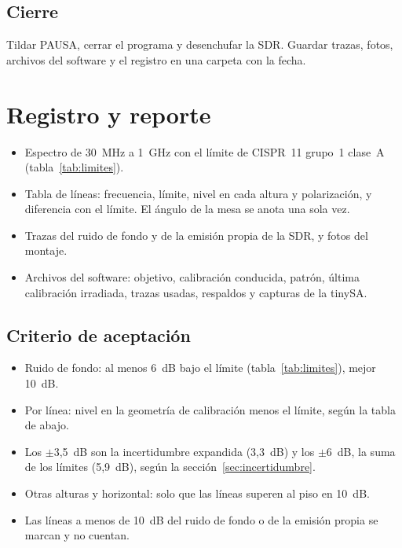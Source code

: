 \documentclass[11pt,a4paper]{article}
\begin{document}
\subsection{Cierre}

Tildar PAUSA, cerrar el programa y desenchufar la SDR. Guardar trazas, fotos, archivos del software y el registro en una carpeta con la fecha.

\section{Registro y reporte}\label{sec:registro}

\begin{itemize}
  \item Espectro de 30~MHz a 1~GHz con el límite de CISPR~11 grupo~1 clase~A (tabla~\ref{tab:limites}).
  \item Tabla de líneas: frecuencia, límite, nivel en cada altura y polarización, y diferencia con el límite. El ángulo de la mesa se anota una sola vez.
  \item Trazas del ruido de fondo y de la emisión propia de la SDR, y fotos del montaje.
  \item Archivos del software: objetivo, calibración conducida, patrón, última calibración irradiada, trazas usadas, respaldos y capturas de la tinySA.
\end{itemize}

\subsection{Criterio de aceptación}\label{sec:criterio}

\begin{itemize}
  \item Ruido de fondo: al menos 6~dB bajo el límite (tabla~\ref{tab:limites}), mejor 10~dB.
  \item Por línea: nivel en la geometría de calibración menos el límite, según la tabla de abajo.
  \item Los $\pm$3,5~dB son la incertidumbre expandida (3,3~dB) y los $\pm$6~dB, la suma de los límites (5,9~dB), según la sección~\ref{sec:incertidumbre}.
  \item Otras alturas y horizontal: solo que las líneas superen al piso en 10~dB.
  \item Las líneas a menos de 10~dB del ruido de fondo o de la emisión propia se marcan y no cuentan.
\end{itemize}
\end{document}
